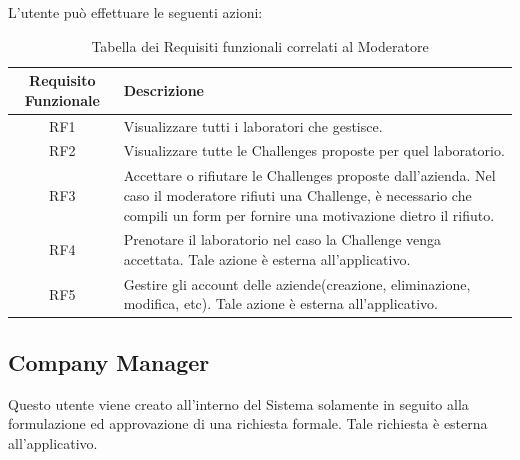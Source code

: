 L'utente può effettuare le seguenti azioni:

\begin{table}[ht]
    \centering
    \begin{tabularx}{\textwidth}{|c|X|}
        \hline
        \textbf{Requisito Funzionale} & \textbf{Descrizione}\\
        \hline
        RF1 & Visualizzare tutti i laboratori che gestisce.\\ 
        \hline
        RF2 & Visualizzare tutte le Challenges proposte per quel laboratorio.\\ 
        \hline
        RF3 & Accettare o rifiutare le Challenges proposte dall'azienda. Nel caso il moderatore rifiuti una Challenge, è necessario che compili un form per fornire una motivazione dietro il rifiuto.\\ 
        \hline
        RF4 & Prenotare il laboratorio nel caso la Challenge venga accettata. Tale azione è esterna all'applicativo.\\ 
        \hline
        RF5 & Gestire gli account delle aziende(creazione, eliminazione, modifica, etc). Tale azione è esterna all'applicativo.\\ 
        \hline
    \end{tabularx}
    \caption{Tabella dei Requisiti funzionali correlati al Moderatore}
\end{table}


\subsection{Company Manager}
\label{subs:company_manager}

Questo utente viene creato all'interno del Sistema solamente in seguito alla formulazione ed approvazione di una richiesta formale. Tale richiesta è esterna all'applicativo.


